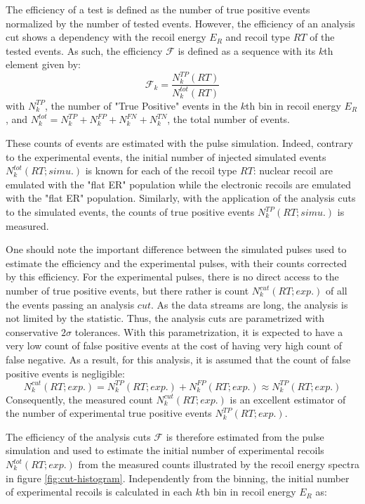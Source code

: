 The efficiency of a test is defined as the number of true positive events normalized by the number of tested events. However, the efficiency of an analysis cut shows a dependency with the recoil energy $E_R$ and recoil type $RT$ of the tested events. As such, the efficiency $\mathcal{F}$ is defined as a sequence with its $k$th element given by:
\begin{equation}
\mathcal{F}_k
=
\frac{ N_k^{TP} (RT)}{ N_k^{tot} (RT)}
\end{equation}
with $N_k^{TP}$, the number of "True Positive" events in the $k$th bin in recoil energy $E_R$, and $N_k^{tot} = N_k^{TP} + N_k^{FP} + N_k^{FN} + N_k^{TN}$, the total number of events.

These counts of events are estimated with the pulse simulation. Indeed, contrary to the experimental events, the initial number of injected simulated events $N_k^{tot} (RT; simu.)$ is known for each of the recoil type $RT$: nuclear recoil are emulated with the "flat ER" population while the electronic recoils are emulated with the "flat ER" population. Similarly, with the application of the analysis cuts to the simulated events, the counts of true positive events $N_k^{TP} (RT; simu.)$ is measured.

One should note the important difference between the simulated pulses used to estimate the efficiency and the experimental pulses, with their counts corrected by this efficiency. For the experimental pulses, there is no direct access to the number of true positive events, but there rather is count $N_k^{cut} (RT; exp.)$ of all the events passing an analysis $cut$. As the data streams are long, the analysis is not limited by the statistic. Thus, the analysis cuts are parametrized with conservative $2\sigma$ tolerances.  With this parametrization, it is expected to have a very low count of false positive events at the cost of having very high count of false negative. As a result, for this analysis, it is assumed that the count of false positive events is negligible:
\begin{equation}
N_k^{cut} (RT; exp.) = N_k^{TP} (RT; exp.) + N_k^{FP} (RT; exp.) \approx N_k^{TP} (RT; exp.)
\end{equation}
Consequently, the measured count $N_k^{cut} (RT; exp.)$ is an excellent estimator of the number of experimental true positive events $N_k^{TP} (RT; exp.)$.

The efficiency of the analysis cuts $\mathcal{F}$ is therefore estimated from the pulse simulation and used to estimate the initial number of experimental recoils $N_k^{tot} (RT; exp.)$ from the measured counts illustrated by the recoil energy spectra in figure \ref{fig:cut-histogram}. Independently from the binning, the initial number of experimental recoils is calculated in each $k$th bin in recoil energy $E_R$ as:

